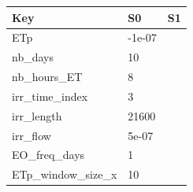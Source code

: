 \documentclass{article}
\begin{document}
\bigskip\noindent
\begin{tabular}{p{}p{}p{}}
\toprule
Key & S0 & S1 \\
\hline
ETp & -1e-07 &  \\
nb\_days & 10 &  \\
nb\_hours\_ET & 8 &  \\
irr\_time\_index & 3 &  \\
irr\_length & 21600 &  \\
irr\_flow & 5e-07 &  \\
EO\_freq\_days & 1 &  \\
ETp\_window\_size\_x & 10 &  \\
\bottomrule
\end{tabular}

\bigskip
\end{document}

